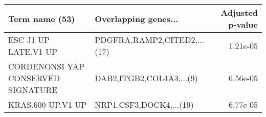 \begin{tabular}{llr}
\toprule
                    Term name (53) &        Overlapping genes... &  Adjusted p-value \\
\midrule
              ESC J1 UP LATE.V1 UP & PDGFRA,RAMP2,CITED2,...(17) &          1.21e-05 \\
CORDENONSI YAP CONSERVED SIGNATURE &    DAB2,ITGB2,COL4A3,...(9) &          6.56e-05 \\
                 KRAS.600 UP.V1 UP &     NRP1,CSF3,DOCK4,...(19) &          6.77e-05 \\
\bottomrule
\end{tabular}

